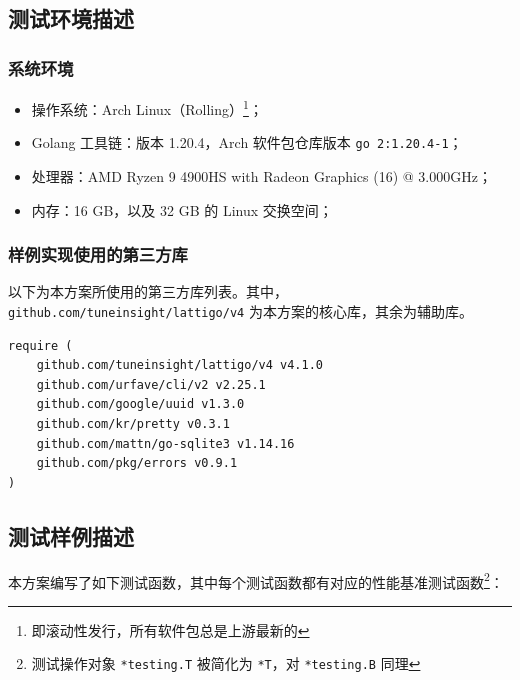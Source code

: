 \subsection{测试环境描述}

\subsubsection*{系统环境}

\begin{itemize}
    \item 操作系统：Arch Linux（Rolling）\footnote{即滚动性发行，所有软件包总是上游最新的}；
    \item Golang 工具链：版本 1.20.4，Arch 软件包仓库版本 \verb|go 2:1.20.4-1|；
    \item 处理器：AMD Ryzen 9 4900HS with Radeon Graphics (16) @ 3.000GHz；
    \item 内存：16 GB，以及 32 GB 的 Linux 交换空间；
\end{itemize}

\subsubsection{样例实现使用的第三方库}

以下为本方案所使用的第三方库列表。其中，\verb|github.com/tuneinsight/lattigo/v4| 为本方案的核心库，其余为辅助库。

\begin{verbatim}
require (
    github.com/tuneinsight/lattigo/v4 v4.1.0
    github.com/urfave/cli/v2 v2.25.1
    github.com/google/uuid v1.3.0
    github.com/kr/pretty v0.3.1
    github.com/mattn/go-sqlite3 v1.14.16
    github.com/pkg/errors v0.9.1
)
\end{verbatim}

\subsection{测试样例描述}

本方案编写了如下测试函数，其中每个测试函数都有对应的性能基准测试函数\footnote{测试操作对象 \texttt{*testing.T} 被简化为 \texttt{*T}，对 \texttt{*testing.B} 同理}：

